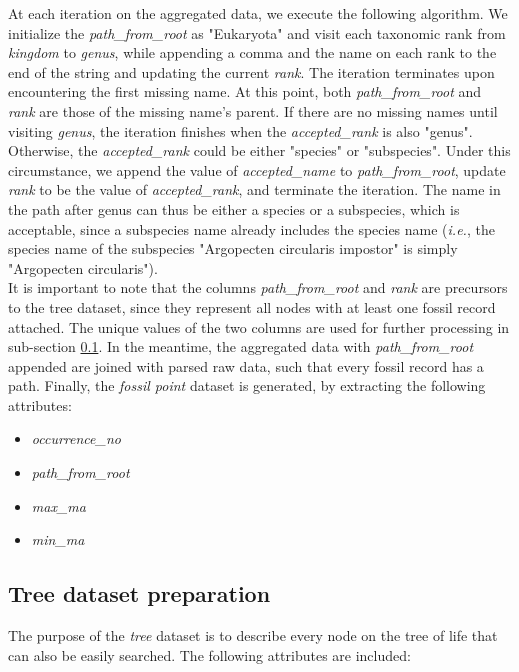 \documentclass[11pt, a4paper,oneside,chapterprefix=false]{scrbook}
\begin{document}
At each iteration on the aggregated data, we execute the following algorithm. We initialize the \emph{path\_from\_root} as "Eukaryota" and visit each taxonomic rank from \emph{kingdom} to \emph{genus}, while appending a comma and the name on each rank to the end of the string and updating the current \emph{rank}. The iteration terminates upon encountering the first missing name. At this point, both \emph{path\_from\_root} and \emph{rank} are those of the missing name's parent. If there are no missing names until visiting \emph{genus}, the iteration finishes when the \emph{accepted\_rank} is also "genus". Otherwise, the \emph{accepted\_rank} could be either "species" or "subspecies". Under this circumstance, we append the value of \emph{accepted\_name} to \emph{path\_from\_root}, update \emph{rank} to be the value of \emph{accepted\_rank}, and terminate the iteration. The name in the path after genus can thus be either a species or a subspecies, which is acceptable, since a subspecies name already includes the species name (\emph{i.e.}, the species name of the subspecies "Argopecten circularis impostor" is simply "Argopecten circularis"). \\

It is important to note that the columns \emph{path\_from\_root} and \emph{rank} are precursors to the tree dataset, since they represent all nodes with at least one fossil record attached. The unique values of the two columns are used for further processing in sub-section \ref{subsec:tree_preparation}. In the meantime, the aggregated data with \emph{path\_from\_root} appended are joined with parsed raw data, such that every fossil record has a path. Finally, the \emph{fossil point} dataset is generated, by extracting the following attributes: 

\begin{itemize}
	\item \textit{occurrence\_no}
	\item \textit{path\_from\_root}
	\item \textit{max\_ma}
	\item \textit{min\_ma}
\end{itemize}


\subsection{Tree dataset preparation} \label{subsec:tree_preparation}
The purpose of the \emph{tree} dataset is to describe every node on the tree of life that can also be easily searched. The following attributes are included: \\
\end{document}

